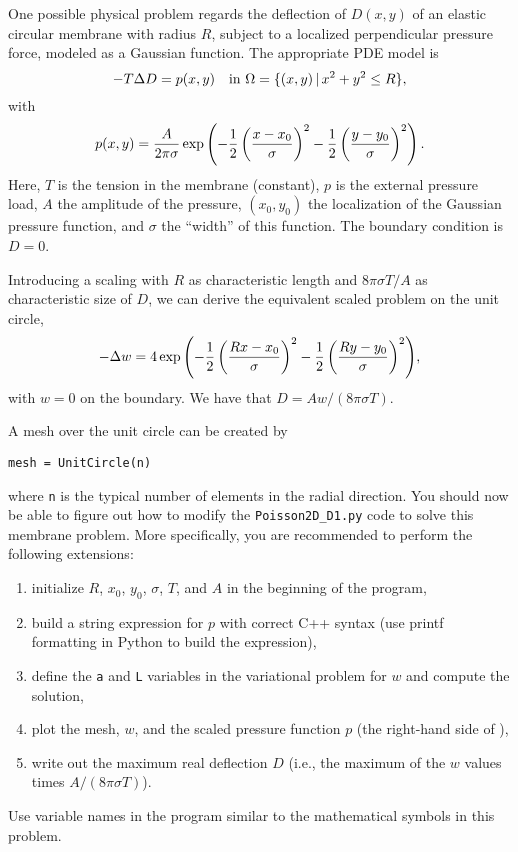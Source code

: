 One possible physical problem regards the deflection
of $D(x,y)$ of an elastic circular membrane
with radius $R$, subject to a localized perpendicular pressure
force, modeled as a Gaussian function.
The appropriate PDE model is
\begin{equation}
-T\Delta D = p(x,y)\quad\hbox{in }\Omega = \{ (x,y)\,|\, x^2+y^2\leq R\},
\end{equation}
with
\begin{equation}
p(x,y) = {A\over 2\pi\sigma}\exp{\left(
- {1\over2}\left( {x-x_0\over\sigma}\right)^2
- {1\over2}\left( {y-y_0\over\sigma}\right)^2
\right)}\, . 
\end{equation}
Here, $T$ is the tension in the membrane (constant), $p$ is the external
pressure load,
$A$ the amplitude of the pressure, $(x_0,y_0)$ the localization of
the Gaussian pressure function, and $\sigma$ the ``width'' of this
function. The boundary condition is $D=0$.

Introducing a scaling with $R$ as characteristic length and
$8\pi\sigma T/A$ as characteristic size of $D$, we can derive the equivalent
scaled problem on the unit circle,
\begin{equation}
\label{langtangen:poisson1:membrane:scaled:eq}
-\Delta w = 
4\exp{\left(
- {1\over2}\left( {Rx-x_0\over\sigma}\right)^2
- {1\over2}\left( {Ry-y_0\over\sigma}\right)^2
\right)},
\end{equation}
with $w=0$ on the boundary. We have that $D = Aw/(8\pi\sigma T)$.

A mesh over the unit circle can be created
by
\begin{Verbatim}[fontsize=\fontsize{10pt}{10pt},tabsize=8,baselinestretch=1.05,
fontfamily=tt,xleftmargin=7mm]
mesh = UnitCircle(n)
\end{Verbatim}
\noindent
where {\fontsize{12pt}{12pt}\texttt{n}} is the typical number of elements in the radial direction.
You should now be able to figure out how to modify the
{\fontsize{12pt}{12pt}\verb!Poisson2D_D1.py!} code to solve this membrane problem.
More specifically, you are recommended to perform the following extensions:
\begin{enumerate}
\item  initialize $R$, $x_0$, $y_0$, $\sigma$, $T$, and $A$ in the 
beginning of the program, 
\item
build a string expression for $p$ with correct C++ syntax
(use printf formatting in Python to build the expression),
\item
define the {\fontsize{12pt}{12pt}\texttt{a}} and {\fontsize{12pt}{12pt}\texttt{L}} variables in the variational problem for 
$w$ and compute the solution, 
\item plot the mesh,
$w$, and the scaled pressure function $p$ (the right-hand side of
),
\item write out the maximum real deflection $D$
(i.e., the maximum of the $w$ values times $A/(8\pi\sigma T)$).
\end{enumerate}
Use variable names in the program similar to the mathematical symbols
in this problem.

